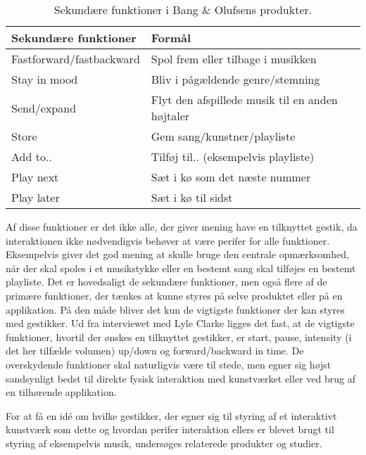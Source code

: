 %
\begin{table}[H]
	\centering
	\begin{tabular}{ | l | p{8cm} |}
		\hline
		\multicolumn{1}{|l|}{\textbf{Sekundære funktioner}} & \multicolumn{1}{l|}{\textbf{Formål}} \\ \hline
		Fastforward/fastbackward & Spol frem eller tilbage i musikken \\ \hline
		Stay in mood & Bliv i pågældende genre/stemning \\ \hline
		Send/expand & Flyt den afspillede musik til en anden højtaler \\ \hline
		Store & Gem sang/kunstner/playliste \\ \hline
		Add to.. & Tilføj til.. (eksempelvis playliste) \\ \hline
		Play next & Sæt i kø som det næste nummer \\ \hline
		Play later & Sæt i kø til sidst \\ \hline
	\end{tabular}
	\caption{Sekundære funktioner i Bang $\&$ Olufsens produkter.}
	\label{tab:BogOsSekundaereFunktioner}
\end{table}
\noindent
%

Af disse funktioner er det ikke alle, der giver mening have en tilknyttet gestik, da interaktionen ikke nødvendigvis behøver at være perifer for alle funktioner. Eksempelvis giver det god mening at skulle bruge den centrale opmærksomhed, når der skal spoles i et musikstykke eller en bestemt sang skal tilføjes en bestemt playliste. Det er hovedsaligt de sekundære funktioner, men også flere af de primære funktioner, der tænkes at kunne styres på selve produktet eller på en applikation. På den måde bliver det kun de vigtigste funktioner der kan styres med gestikker. Ud fra interviewet med Lyle Clarke ligges det fast, at de vigtigste funktioner, hvortil der ønskes en tilknyttet gestikker, er start, pause, intensity (i det her tilfælde volumen) up/down og forward/backward in time. De overskydende funktioner skal naturligvis være til stede, men egner sig højst sandsynligt bedst til direkte fysisk interaktion med kunstværket eller ved brug af en tilhørende applikation.

For at få en idé om hvilke gestikker, der egner sig til styring af et interaktivt kunstværk som dette og hvordan perifer interaktion ellers er blevet brugt til styring af eksempelvis musik, undersøges relaterede produkter og studier. 



